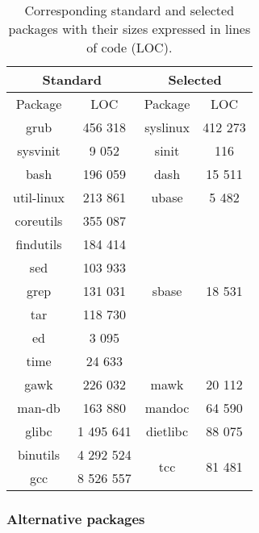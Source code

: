\begin{table}[!h]
    \centering
    \begin{tabular}{|c|c||c|c|}
        \hline
        \multicolumn{2}{|c||}{Standard} & \multicolumn{2}{|c|}{Selected} \\
        \hline
        \hline
        Package & LOC & Package & LOC \\
        \hline
        \hline
        grub \cite{grub} & 456 318 & syslinux \cite{syslinux} & 412 273 \\
        \hline
        sysvinit \cite{sysvinit} & 9 052 & sinit \cite{sinit} & 116 \\
        \hline
        bash \cite{bash} & 196 059 & dash \cite{dash} & 15 511 \\
        \hline
        util-linux \cite{util-linux} & 213 861 & ubase \cite{ubase} & 5 482 \\
        \hline
        coreutils \cite{coreutils} & 355 087 & \multirow{7}{*}{sbase \cite{sbase}} & \multirow{7}{*}{18 531} \\
        findutils \cite{findutils} & 184 414 & & \\
        sed \cite{sed} & 103 933 & & \\
        grep \cite{grep} & 131 031 & & \\
        tar \cite{tar} & 118 730 & & \\
        ed \cite{ed} & 3 095 & & \\
        time \cite{time} & 24 633 & & \\
        \hline
        gawk \cite{gawk} & 226 032 & mawk \cite{mawk} & 20 112 \\
        \hline
        man-db \cite{man-db} & 163 880 & mandoc \cite{mandoc} & 64 590 \\
        \hline
        glibc \cite{glibc} & 1 495 641 & dietlibc \cite{dietlibc} & 88 075 \\
        \hline
        binutils \cite{binutils} & 4 292 524 & \multirow{2}{*}{tcc \cite{tcc}} & \multirow{2}{*}{81 481} \\
        gcc \cite{gcc} & 8 526 557 & & \\
        \hline
    \end{tabular}
    \caption{Corresponding standard and selected packages with their sizes expressed in lines of code (LOC).}
\end{table}

\newpage

\subsubsection{Alternative packages}

